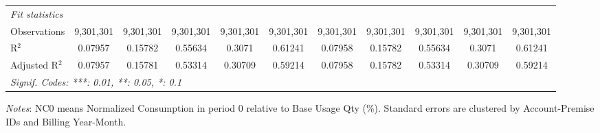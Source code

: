 \begin{table}[htbp]
\begin{adjustbox}{scale = 0.57}
\begin{tabular}{lcccccccccc}
\midrule
\emph{Fit statistics}&  & & & & & & & & & \\
Observations & 9,301,301&9,301,301&9,301,301&9,301,301&9,301,301&9,301,301&9,301,301&9,301,301&9,301,301&9,301,301\\
R$^2$ & 0.07957&0.15782&0.55634&0.3071&0.61241&0.07958&0.15782&0.55634&0.3071&0.61241\\
Adjusted R$^2$ & 0.07957&0.15781&0.53314&0.30709&0.59214&0.07958&0.15782&0.53314&0.30709&0.59214\\
\bottomrule\bottomrule
\multicolumn{11}{l}{\emph{Signif. Codes: ***: 0.01, **: 0.05, *: 0.1}}\\
\end{tabular}
\end{adjustbox}
\begin{tablenotes}
\footnotesize
\emph{\medskip Notes}: NC0 means Normalized Consumption in period 0 relative to Base Usage Qty (\%). Standard errors are clustered by Account-Premise IDs and Billing Year-Month.
\end{tablenotes}
\end{table}